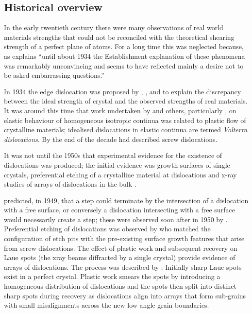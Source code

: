 \FloatBarrier

\subsection{Historical overview}


In the early twentieth century there were many observations of real world materials strengths that could not be reconciled with the theoretical shearing strength of a perfect plane of atoms. For a long time this was neglected because, as \citet{gordon1991} explains ``until about 1934 the Establishment explanation of these phenomena was remarkably unconvincing and seems to have reflected mainly a desire not to be asked embarrassing questions.''

In 1934 the edge dislocation was proposed by \citet{orowan1934i,Orowan1934ii,Orowan1934iii}, \citet{Taylor1934}, and \citet{polanyi1934} to explain the discrepancy between the ideal strength of crystal and the observed strengths of real materials. It was around this time that work undertaken by \citet{Volterra1907} and others, particularly \citet{love1920},
on elastic behaviour of homogeneous isotropic continua was related to plastic flow of crystalline materials; idealised dislocations in elastic continua are termed \emph{Volterra dislocations}. By the end of the decade \citet{burgers1939} had described screw dislocations. 

It was not until the 1950s that experimental evidence for the existence of dislocations was produced; the initial evidence was growth surfaces of single crystals, preferential etching of a crystalline material at dislocations and x-ray studies of arrays of dislocations in the bulk \cite{Forty1954}. 

\citet{Frank1949} predicted, in 1949, that a step could terminate by the intersection of a dislocation with a free surface, or conversely a dislocation intersecting with a free surface would necessarily create a step; these were observed soon after in 1950 by \citet{Griffin1950}. Preferential etching of dislocations was observed by \citet{horn1952holes} who matched the configuration of etch pits with the pre-existing surface growth features that arise from screw dislocations. The effect of plastic work and subsequent recovery on Laue spots (the xray beams diffracted by a single crystal) provide evidence of arrays of dislocations. The process was described by \citet{Cottrell1949}: Initially sharp Laue spots exist in a perfect crystal. Plastic work smears the spots by introducing a homogeneous distribution of dislocations and the spots then split into distinct sharp spots during recovery as dislocations align into arrays that form sub-grains with small misalignments across the new low angle grain boundaries.


